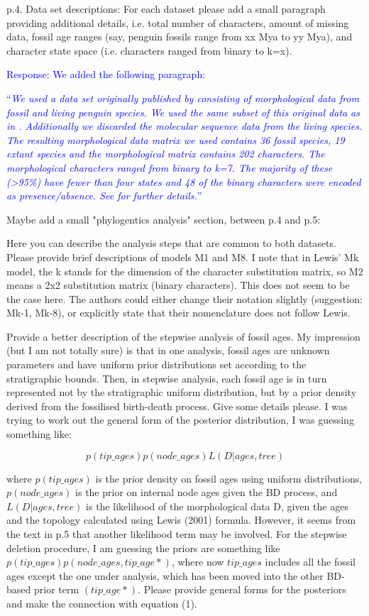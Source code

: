\documentclass[11pt]{article}
\newcommand{\response}[1]{\medskip{}\textcolor{blue}{{Response: #1}}\medskip{}}
\newcommand{\respquote}[1]{\medskip{}\textcolor{blue}{``{\it #1}''}\medskip{}}
\begin{document}
p.4. Data set descriptions: For each dataset please add a small paragraph providing additional details, i.e. total number of characters, amount of missing data, fossil age ranges (say, penguin fossils range from xx Mya to yy Mya), and character state space (i.e. characters ranged from binary to k=x).

\response{We added the following paragraph:}

\respquote{We used a data set originally published by \cite{ksepka2012} consisting of morphological data from fossil and living penguin 
species. 
We used the same subset of this original data as in \cite{gavryushkina2015bayesian}. 
Additionally we discarded the molecular sequence data from the living species. 
The resulting morphological data matrix we used contains 36 fossil species, 19 extant species and the morphological matrix contains 202 characters. 
The morphological characters ranged from binary to k=7. 
The majority of these (\textgreater 95\%) have fewer than four states and 48 of the binary characters were encoded as presence/absence. 
See \cite{gavryushkina2015bayesian} for further details.}

Maybe add a small "phylogentics analysis" section, between p.4 and p.5: 

Here you can describe the analysis steps that are common to both datasets. Please provide brief descriptions of models M1 and M8. I note that in Lewis' Mk model, the k stands for the dimension of the character substitution matrix, so M2 means a 2x2 substitution matrix (binary characters). This does not seem to be the case here. The authors could either change their notation slightly (suggestion: Mk-1, Mk-8), or explicitly state that their nomenclature does not follow Lewis. 

Provide a better description of the stepwise analysis of fossil ages. My impression (but I am not totally sure) is that in one analysis, fossil ages are unknown parameters and have uniform prior distributions set according to the stratigraphic bounds. Then, in stepwise analysis, each fossil age is in turn represented not by the stratigraphic uniform distribution, but by a prior density derived from the fossilised birth-death process. Give some details please. I was trying to work out the general form of the posterior distribution, I was guessing something like:

$$p(tip\_ages) p(node\_ages) L(D|ages,tree)$$

where $p(tip\_ages)$ is the prior density on fossil ages using uniform distributions, $p(node\_ages)$ is the prior on internal node ages given the BD process, and $L(D|ages,tree)$ is the likelihood of the morphological data D, given the ages and the topology calculated using Lewis (2001) formula. However, it seems from the text in p.5 that another likelihood term may be involved. For the stepwise deletion procedure, I am guessing the priors are something like $p(tip\_ages\hat{}) p(node\_ages, tip\_age*)$, where now $tip\_ages\hat{}$ includes all the fossil ages except the one under analysis, which has been moved into the other BD-based prior term $(tip\_age*)$. Please provide general forms for the posteriors and make the connection with equation (1).
\end{document}

